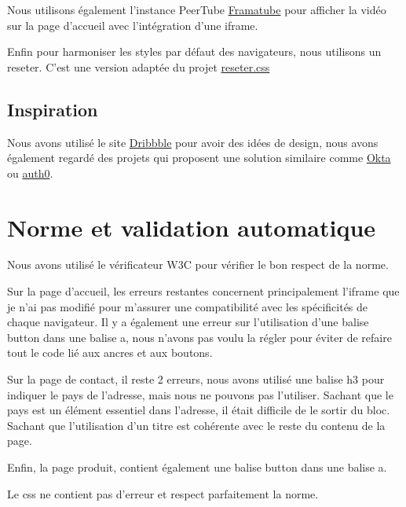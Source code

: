 \documentclass{article}
\begin{document}
Nous utilisons également l'instance PeerTube \href{https://framatube.org}{Framatube} pour afficher la vidéo sur la page d'accueil avec l'intégration d'une iframe.

Enfin pour harmoniser les styles par défaut des navigateurs, nous utilisons un reseter. C'est une version adaptée du projet \href{https://github.com/resetercss/reseter.css/blob/main/css/minireseter.css}{reseter.css}

\subsection{Inspiration}
Nous avons utilisé le site \href{https://dribbble.com/}{Dribbble} pour avoir des idées de design, nous avons également regardé des projets qui proposent une solution similaire comme \href{https://www.okta.com/}{Okta} ou \href{https://auth0.com}{auth0}.

\section{Norme et validation automatique}
Nous avons utilisé le vérificateur W3C pour vérifier le bon respect de la norme.

Sur la page d'accueil, les erreurs restantes concernent principalement l'iframe que je n'ai pas modifié pour m'assurer une compatibilité avec les spécificités de chaque navigateur. Il y a également une erreur sur l'utilisation d'une balise button dans une balise a, nous n'avons pas voulu la régler pour éviter de refaire tout le code lié aux ancres et aux boutons.

Sur la page de contact, il reste 2 erreurs, nous avons utilisé une balise h3 pour indiquer le pays de l'adresse, mais nous ne pouvons pas l'utiliser. Sachant que le pays est un élément essentiel dans l'adresse, il était difficile de le sortir du bloc. Sachant que l'utilisation d'un titre est cohérente avec le reste du contenu de la page.

Enfin, la page produit, contient également une balise button dans une balise a.

Le css ne contient pas d'erreur et respect parfaitement la norme.
\end{document}

